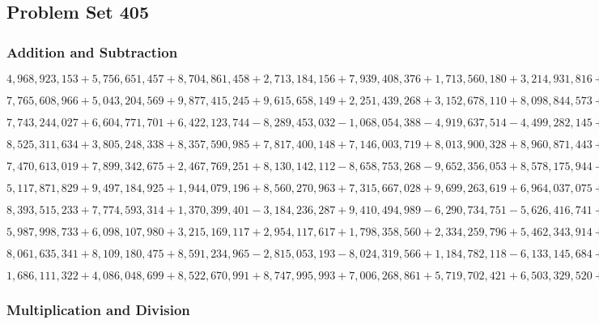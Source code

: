 \hypertarget{problem-set-405}{%
\subsection{Problem Set 405}\label{problem-set-405}}

\hypertarget{addition-and-subtraction}{%
\subsubsection{Addition and
Subtraction}\label{addition-and-subtraction}}

\(4,968,923,153+5,756,651,457+8,704,861,458+2,713,184,156+7,939,408,376+1,713,560,180+3,214,931,816+2,965,675,553+5,034,248,508+7,069,584,375\)

\(7,765,608,966+5,043,204,569+9,877,415,245+9,615,658,149+2,251,439,268+3,152,678,110+8,098,844,573+8,826,133,855+8,764,705,996+8,518,715,650\)

\(7,743,244,027+6,604,771,701+6,422,123,744-8,289,453,032-1,068,054,388-4,919,637,514-4,499,282,145+6,081,035,238+5,947,286,067+9,183,175,511\)

\(8,525,311,634+3,805,248,338+8,357,590,985+7,817,400,148+7,146,003,719+8,013,900,328+8,960,871,443+4,982,904,213+1,725,778,746+2,456,534,053\)

\(7,470,613,019+7,899,342,675+2,467,769,251+8,130,142,112-8,658,753,268-9,652,356,053+8,578,175,944-3,752,172,647+5,373,362,348-4,273,000,897\)

\(5,117,871,829+9,497,184,925+1,944,079,196+8,560,270,963+7,315,667,028+9,699,263,619+6,964,037,075+9,334,396,981+3,042,689,437+3,893,872,421\)

\(8,393,515,233+7,774,593,314+1,370,399,401-3,184,236,287+9,410,494,989-6,290,734,751-5,626,416,741+1,606,145,821-7,186,249,377+6,287,739,240\)

\(5,987,998,733+6,098,107,980+3,215,169,117+2,954,117,617+1,798,358,560+2,334,259,796+5,462,343,914+6,714,788,746+2,334,775,095+4,205,297,898\)

\(8,061,635,341+8,109,180,475+8,591,234,965-2,815,053,193-8,024,319,566+1,184,782,118-6,133,145,684+1,129,644,856+9,711,593,314-1,593,101,566\)

\(1,686,111,322+4,086,048,699+8,522,670,991+8,747,995,993+7,006,268,861+5,719,702,421+6,503,329,520+7,108,187,525+3,986,541,106+2,158,454,223\)

\hypertarget{multiplication-and-division}{%
\subsubsection{Multiplication and
Division}\label{multiplication-and-division}}

